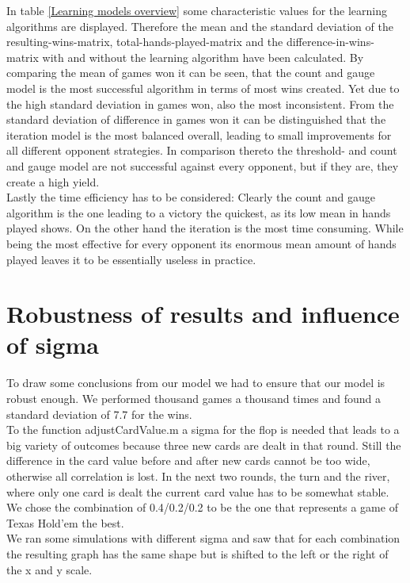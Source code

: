 \documentclass[11pt]{article}
\begin{document}
In table \ref{Learning models overview} some characteristic values for the learning algorithms are displayed. Therefore the mean and the standard deviation of the resulting-wins-matrix, total-hands-played-matrix and the difference-in-wins-matrix with and without the learning algorithm have been calculated. By comparing the mean of games won it can be seen, that the count and gauge model is the most successful algorithm in terms of most wins created. Yet due to the high standard deviation in games won, also the most inconsistent. From the standard deviation of difference in games won it can be distinguished that the iteration model is the most balanced overall, leading to small improvements for all different opponent strategies. In comparison thereto the threshold- and count and gauge model are not successful against every opponent, but if they are, they create a high yield. \\

Lastly the time efficiency has to be considered: Clearly the count and gauge algorithm is the one leading to a victory the quickest, as its low mean in hands played shows. On the other hand the iteration is the most time consuming. While being the most effective for every opponent its enormous mean amount of hands played leaves it to be essentially useless in practice.


\section{Robustness of results and influence of sigma}

To draw some conclusions from our model we had to ensure that our model is robust enough. We performed thousand games a thousand times and found a standard deviation of 7.7 for the wins.\\

To the function adjustCardValue.m a sigma for the flop is needed that leads to a big variety of outcomes because three new cards are dealt in that round. Still the difference in the card value before and after new cards cannot be too wide, otherwise all correlation is lost. In the next two rounds, the turn and the river, where only one card is dealt the current card value has to be somewhat stable.\\

We chose the combination of 0.4/0.2/0.2 to be the one that represents a game of Texas Hold'em the best. \\

We ran some simulations with different sigma and saw that for each combination the resulting graph has the same shape but is shifted to the left or the right of the x and y scale.
\end{document}
